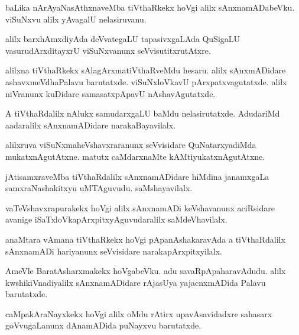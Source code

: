 \documentclass{article}
\begin{document}
\begin{mn}
baLika nArAyaNasAthxnaveMba tiVthaRkekx hoVgi alilx sAnxnamADabeVku. viSuNxvu alilx yAvagalU
nelasiruvanu.
\end{mn}

\begin{mn}
alilx barxhAmxdiyAda deVvategaLU tapasivxgaLAda QuSigaLU vasurudArxditayxrU viSuNxvanunx 
seVvisutitxrutAtxre.
\end{mn}

\begin{mn}
alilxna tiVthaRkekx sAlagArxmatiVthaRveMdu hesaru. alilx sAnxmADidare ashavxmeVdhaPalavu 
barutatxde. viSuNxloVkavU pArxpatxvagutatxde. alilx niVranunx kuDidare samasatxpApavU 
nAshavAgutatxde.
\end{mn}

\begin{mn}
A tiVthaRdalilx nAlukx samudarxgaLU baMdu nelasirutatxde. AdudariMd aadaralilx sAnxnamADidare 
narakaBayavilalx.
\end{mn}

\begin{mn}
alilxruva viSuNxmaheVshavxraranunx seVvisidare QuNatarxyadiMda mukatxnAgutAtxne. matutx 
caMdarxnaMte kAMtiyukatxnAgutAtxne.
\end{mn}

\begin{mn}
jAtisamxraveMba tiVthaRdalilx sAnxnamADidare hiMdina janamxgaLa samxraNashakitxyu uMTAguvudu. 
saMshayavilalx.
\end{mn}

\begin{mn}
vaTeVshavxrapurakekx hoVgi alilx sAnxnamADi keVshavanunx aciRsidare avanige 
iSaTxloVkapArxpitxyAguvudaralilx saMdeVhavilalx.
\end{mn}

\begin{mn}
anaMtara vAmana tiVthaRkekx hoVgi pApanAshakaravAda a tiVthaRdalilx sAnxnamADi hariyanunx 
seVvisidare narakapArxpitxyilalx.
\end{mn}

\begin{mn}
AmeVle BaratAsharxmakekx hoVgabeVku. adu savaRpApaharavAdudu. alilx kwshikiVnadiyalilx 
sAnxnamADidare rAjasUya yajacnxmADida Palavu barutatxde.
\end{mn}

\begin{mn}
caMpakAraNayxkekx hoVgi alilx oMdu rAtirx upavAsavidadxre sahasarx goVvugaLanunx dAnamADida 
puNayxvu barutatxde.
\end{mn}
\end{document}
